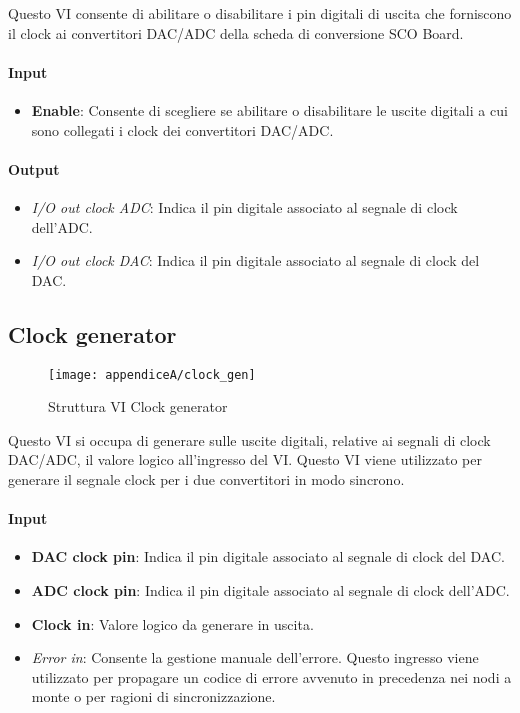 Questo VI consente di abilitare o disabilitare i pin digitali di uscita che forniscono il clock ai convertitori DAC/ADC della scheda di conversione SCO Board.
\paragraph*{Input}
\begin{itemize}
	\item \textbf{Enable}: Consente di scegliere se abilitare o disabilitare le uscite digitali a cui sono collegati i clock dei convertitori DAC/ADC.
\end{itemize}

\paragraph*{Output}
\begin{itemize}
	\item \textit{I/O out clock ADC}: Indica il pin digitale associato al segnale di clock dell'ADC.
	\item \textit{I/O out clock DAC}: Indica il pin digitale associato al segnale di clock del DAC.
\end{itemize}

\subsection*{Clock generator}

\begin{figure}[H]
	\begin{center}
		\texttt{[image: appendiceA/clock\_gen]}
		\caption{Struttura VI Clock generator}
	\end{center}
\end{figure}

Questo VI si occupa di generare sulle uscite digitali, relative ai segnali di clock DAC/ADC, il valore logico all'ingresso del VI. Questo VI viene utilizzato per generare il segnale clock per i due convertitori in modo sincrono.

\paragraph*{Input}
\begin{itemize}
	\item \textbf{DAC clock pin}: Indica il pin digitale associato al segnale di clock del DAC.
	\item \textbf{ADC clock pin}: Indica il pin digitale associato al segnale di clock dell'ADC.
	\item \textbf{Clock in}: Valore logico da generare in uscita.
	\item \textit{Error in}: Consente la gestione manuale dell'errore. Questo ingresso viene utilizzato per propagare un codice di errore avvenuto in precedenza nei nodi a monte o per ragioni di sincronizzazione.
\end{itemize}


